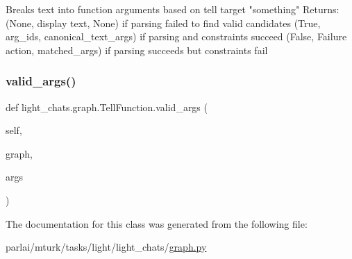 \begin{DoxyVerb}Breaks text into function arguments based on tell target "something"
Returns:
(None, display text, None) if parsing failed to find valid candidates
(True, arg_ids, canonical_text_args) if parsing and constraints succeed
(False, Failure action, matched_args)
if parsing succeeds but constraints fail
\end{DoxyVerb}
 \mbox{\label{classlight__chats_1_1graph_1_1TellFunction_a86e8534217b3d10cb4daf5cc080d624e}} 
\subsubsection{\texorpdfstring{valid\+\_\+args()}{valid\_args()}}
{\footnotesize\ttfamily def light\+\_\+chats.\+graph.\+Tell\+Function.\+valid\+\_\+args (\begin{DoxyParamCaption}\item[{}]{self,  }\item[{}]{graph,  }\item[{}]{args }\end{DoxyParamCaption})}



The documentation for this class was generated from the following file\+:\begin{DoxyCompactItemize}
\item 
parlai/mturk/tasks/light/light\+\_\+chats/\hyperlink{parlai_2mturk_2tasks_2light_2light__chats_2graph_8py}{graph.\+py}\end{DoxyCompactItemize}
